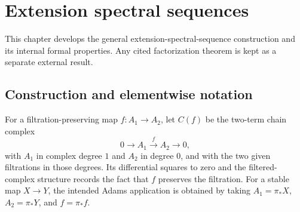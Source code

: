 \chapter{Extension spectral sequences}
\label{chap:extension-ss}

This chapter develops the general extension-spectral-sequence construction and its internal formal properties.  Any cited factorization theorem is kept as a separate external result.

\section{Construction and elementwise notation}

\begin{definition}
  \label{def:filtered-two-term-complex}
  \notready
  For a filtration-preserving map $f:A_1\to A_2$, let $C(f)$ be the
  two-term chain complex
  \[
    0\longrightarrow A_1\xrightarrow{f}A_2
      \longrightarrow0,
  \]
  with $A_1$ in complex degree $1$ and $A_2$ in degree $0$, and with the two
  given filtrations in those degrees.  Its differential squares to zero and
  the filtered-complex structure records the fact that $f$ preserves the
  filtration.  For a stable map $X\to Y$, the intended Adams application is
  obtained by taking $A_1=\pi_*X$, $A_2=\pi_*Y$, and $f=\pi_*f$.
\end{definition}

